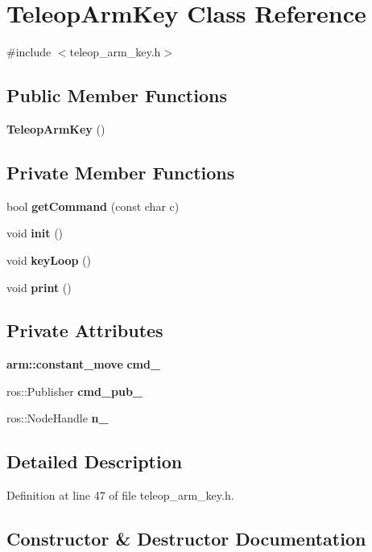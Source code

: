 \section{\-Teleop\-Arm\-Key \-Class \-Reference}
\label{classTeleopArmKey}


{\ttfamily \#include $<$teleop\-\_\-arm\-\_\-key.\-h$>$}

\subsection*{\-Public \-Member \-Functions}
\begin{DoxyCompactItemize}
\item 
{\bf \-Teleop\-Arm\-Key} ()
\end{DoxyCompactItemize}
\subsection*{\-Private \-Member \-Functions}
\begin{DoxyCompactItemize}
\item 
bool {\bf get\-Command} (const char c)
\item 
void {\bf init} ()
\item 
void {\bf key\-Loop} ()
\item 
void {\bf print} ()
\end{DoxyCompactItemize}
\subsection*{\-Private \-Attributes}
\begin{DoxyCompactItemize}
\item 
{\bf arm\-::constant\-\_\-move} {\bf cmd\-\_\-}
\item 
ros\-::\-Publisher {\bf cmd\-\_\-pub\-\_\-}
\item 
ros\-::\-Node\-Handle {\bf n\-\_\-}
\end{DoxyCompactItemize}


\subsection{\-Detailed \-Description}


\-Definition at line 47 of file teleop\-\_\-arm\-\_\-key.\-h.



\subsection{\-Constructor \& \-Destructor \-Documentation}
